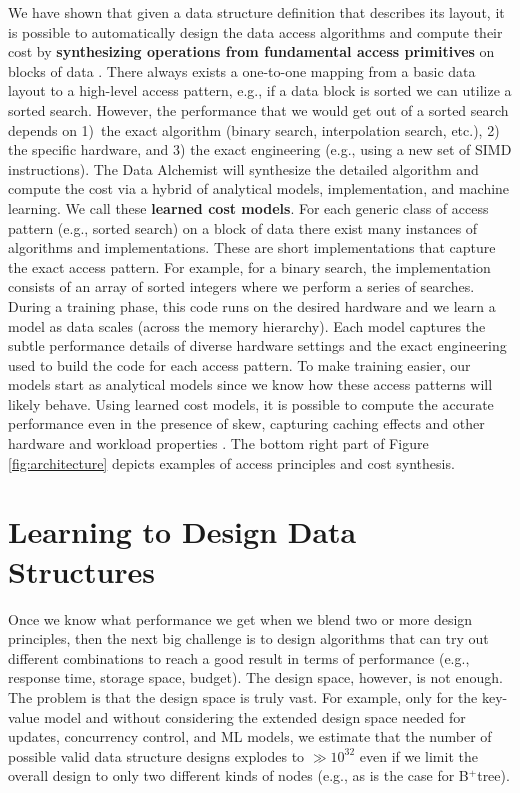 \documentclass[11pt]{article}
\begin{document}
We have shown that given a data structure definition that describes its layout, it is possible to automatically design the data access algorithms and compute their cost by \textbf{synthesizing operations from fundamental access primitives} on blocks of data \cite{Idreos2018,Idreos2018c}. There always exists a one-to-one mapping from a basic data layout to a high-level access pattern, e.g., if a data block is sorted we can utilize a sorted search. However, the performance that we would get out of a sorted search depends on 1)~the exact algorithm (binary search, interpolation search, etc.), 2) the specific hardware, and 3) the exact engineering (e.g., using a new set of SIMD instructions). The Data Alchemist will synthesize the detailed algorithm and compute the cost via a hybrid of analytical models, implementation, and machine learning. We call these \textbf{learned cost models}. For each generic class of access pattern (e.g., sorted search) on a block of data there exist many instances of algorithms and implementations. These are short implementations that capture the exact access pattern. For example, for a binary search, the implementation consists of an array of sorted integers where we perform a series of searches. During a training phase, this code runs on the desired hardware and we learn a model as data scales (across the memory hierarchy). Each model captures the subtle performance details of diverse hardware settings and the exact engineering used to build the code for each access pattern. To make training easier, our models start as analytical models since we know how these access patterns will likely behave. Using learned cost models, it is possible to compute the accurate performance even in the presence of skew, capturing caching effects and other hardware and workload properties \cite{Idreos2018,Idreos2018c}. The bottom right part of Figure \ref{fig:architecture} depicts examples of access principles and cost synthesis. 


\section{Learning to Design Data Structures}

Once we know what performance we get when we blend two or more design principles, then the next big challenge is to design algorithms that can try out different combinations to reach a good result in terms of performance (e.g., response time, storage space, budget). The design space, however, is not enough. The problem is that the design space is truly vast. For example, only for the key-value model \cite{Idreos2018,Idreos2018c} and without considering the extended design space needed for updates, concurrency control, and ML models, we estimate that the number of possible valid data structure designs explodes to $\gg10^{32}$ even if we limit the overall design to only two different kinds of nodes (e.g., as is the case for B$^{+}$tree). 
\end{document}
